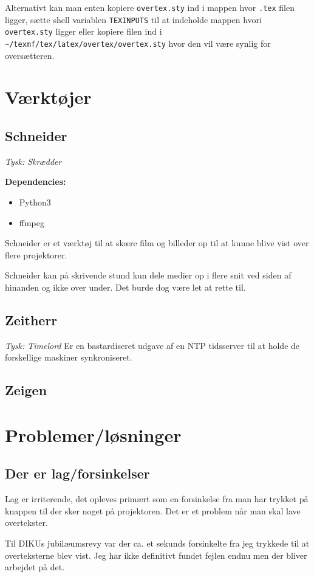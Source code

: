 \documentclass[10pt,a4paper,danish]{article}
\begin{document}
Alternativt kan man enten kopiere \texttt{overtex.sty} ind i mappen hvor \texttt{.tex}
filen ligger, sætte shell variablen \texttt{TEXINPUTS} til at indeholde mappen hvori
\texttt{overtex.sty} ligger eller kopiere filen ind i
\texttt{\~{}/texmf/tex/latex/overtex/overtex.sty} hvor den vil være synlig for oversætteren.


\section{Værktøjer}
\subsection{Schneider}
\textit{Tysk: Skrædder}

\textbf{Dependencies:}
\begin{itemize}
\item Python3
\item ffmpeg
\end{itemize}

Schneider er et værktøj til at skære film og billeder op til at kunne blive vist over flere
projektorer.

Schneider kan på skrivende stund kun dele medier op i flere snit ved siden af
hinanden og ikke over under. Det burde dog være let at rette til.

\subsection{Zeitherr}
\textit{Tysk: Timelord}
Er en bastardiseret udgave af en NTP tidsserver til at holde de forskellige
maskiner synkroniseret.

\subsection{Zeigen}

\section{Problemer/løsninger}
\subsection{Der er lag/forsinkelser}
Lag er irriterende, det opleves primært som en forsinkelse fra man har trykket
på knappen til der sker noget på projektoren. Det er et problem når man skal
lave overtekster.

Til DIKUs jubilæumsrevy var der ca. et sekunds forsinkelte fra jeg trykkede til
at overteksterne blev vist. Jeg har ikke definitivt fundet fejlen endnu men der
bliver arbejdet på det.
\end{document}
